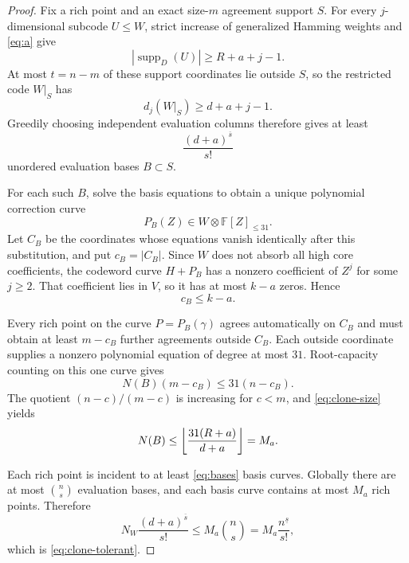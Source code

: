 \documentclass[11pt,a4paper]{amsart}
\numberwithin{equation}{section}
\theoremstyle{remark}
\DeclareMathOperator{\supp}{supp}\DeclareMathOperator{\Fib}{Fib}\DeclareMathOperator{\Sym}{Sym}
\newcommand{\F}{\mathbb F}\newcommand{\B}{\mathbb B}\newcommand{\K}{\mathbb K}\newcommand{\Z}{\mathbb Z}
\newcommand{\fall}[2]{#1^{\underline{#2}}}\newcommand{\rise}[2]{#1^{\overline{#2}}}
\begin{document}
\begin{proof}
Fix a rich point and an exact size-$m$ agreement support $S$.  For every $j$-dimensional subcode $U\le W$, strict increase of generalized Hamming weights and \eqref{eq:a} give
\[
 |\supp_D(U)|\ge R+a+j-1.
\]
At most $t=n-m$ of these support coordinates lie outside $S$, so the restricted code $W|_S$ has
\[
 d_j(W|_S)\ge d+a+j-1.
\]
Greedily choosing independent evaluation columns therefore gives at least
\begin{equation}\label{eq:bases}
 \frac{\rise{(d+a)}s}{s!}
\end{equation}
unordered evaluation bases $B\subset S$.

For each such $B$, solve the basis equations to obtain a unique polynomial correction curve
\[
 P_B(Z)\in W\otimes\F[Z]_{\le31}.
\]
Let $C_B$ be the coordinates whose equations vanish identically after this substitution, and put $c_B=|C_B|$.  Since $W$ does not absorb all high core coefficients, the codeword curve $H+P_B$ has a nonzero coefficient of $Z^j$ for some $j\ge2$.  That coefficient lies in $V$, so it has at most $k-a$ zeros.  Hence
\begin{equation}\label{eq:clone-size}
 c_B\le k-a.
\end{equation}

Every rich point on the curve $P=P_B(\gamma)$ agrees automatically on $C_B$ and must obtain at least $m-c_B$ further agreements outside $C_B$.  Each outside coordinate supplies a nonzero polynomial equation of degree at most $31$.  Root-capacity counting on this one curve gives
\[
 N(B)(m-c_B)\le31(n-c_B).
\]
The quotient $(n-c)/(m-c)$ is increasing for $c<m$, and \eqref{eq:clone-size} yields
\[
 N(B)\le
 \left\lfloor \frac{31(R+a)}{d+a}\right\rfloor=M_a.
\]

Each rich point is incident to at least \eqref{eq:bases} basis curves.  Globally there are at most $\binom ns$ evaluation bases, and each basis curve contains at most $M_a$ rich points.  Therefore
\[
 N_W\frac{\rise{(d+a)}s}{s!}
 \le M_a\binom ns
 =M_a\frac{\fall ns}{s!},
\]
which is \eqref{eq:clone-tolerant}.
\end{proof}
\end{document}
